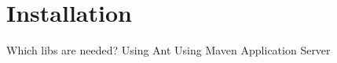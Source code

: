 \chapter{Installation}
\label{cha:Installation}

Which libs are needed?
Using Ant 
Using Maven
Application Server
